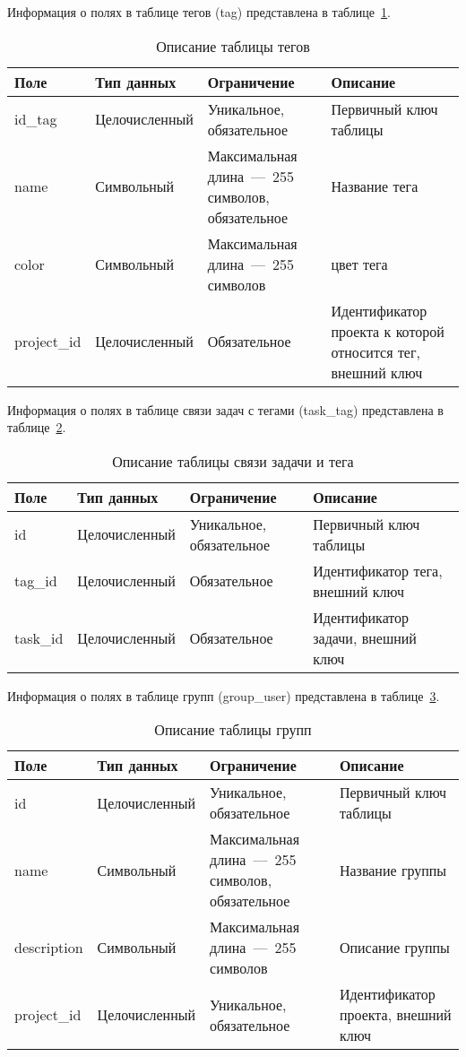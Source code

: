 Информация о полях в таблице тегов (tag) представлена в таблице~\ref{tab:tag}.


\begin{table}[H]
	\centering
	\caption{Описание таблицы тегов}
	\label{tab:tag}
	\begin{tabularx}{\textwidth}{|l|l|X|X|}
		\hline
		\textbf{Поле} & \textbf{Тип данных}& \textbf{Ограничение} & \textbf{Описание} \\ \hline
		id\_tag & Целочисленный  &  Уникальное, обязательное  & Первичный ключ таблицы  \\ \hline
		name   & Символьный & Максимальная длина~---~255 символов, обязательное&  Название тега\\ \hline
		color  & Символьный & Максимальная длина~---~255 символов & цвет тега \\ \hline
		project\_id & Целочисленный    & Обязательное & Идентификатор проекта к которой относится тег, внешний ключ  \\ \hline
	\end{tabularx}
\end{table}



Информация о полях в таблице связи задач с тегами (task\_tag) представлена в таблице~\ref{tab:tasktag}.


\begin{table}[H]
	\centering
	\caption{Описание таблицы связи задачи и тега}
	\label{tab:tasktag}
	\begin{tabularx}{\textwidth}{|l|l|X|X|}
		\hline
		\textbf{Поле} & \textbf{Тип данных}& \textbf{Ограничение}   & \textbf{Описание} \\ \hline
		id & Целочисленный   &  Уникальное, обязательное  & Первичный ключ таблицы  \\ \hline
		tag\_id   & Целочисленный & Обязательное & Идентификатор тега, внешний ключ \\ \hline
		task\_id & Целочисленный & Обязательное& Идентификатор задачи, внешний ключ\\ \hline
	\end{tabularx}
\end{table}

Информация о полях в таблице групп (group\_user) представлена в таблице~\ref{tab:group}.
\begin{table}[H]
	\centering
	\caption{Описание таблицы групп}
	\label{tab:group}
	\begin{tabularx}{\textwidth}{|l|l|X|X|}
		\hline
		\textbf{Поле} & \textbf{Тип данных } & \textbf{Ограничение}  & \textbf{Описание} \\ \hline
		id & Целочисленный   &  Уникальное, обязательное   & Первичный ключ таблицы  \\ \hline
		name & Символьный & Максимальная длина~---~255 символов, обязательное & Название группы\\ \hline
		description   & Символьный & Максимальная длина~---~255 символов  & Описание группы\\ \hline
		project\_id & Целочисленный  &  Уникальное, обязательное & Идентификатор проекта, внешний ключ\\ \hline
	\end{tabularx}
\end{table}



